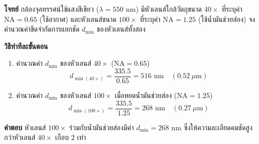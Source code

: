 \begin{worked}
\textbf{โจทย์} กล้องจุลทรรศน์ใช้แสงสีเขียว ($\lambda = 550\text{ nm}$) มีหัวเลนส์ใกล้วัตถุขนาด $40\times$ ที่ระบุค่า $\text{NA} = 0.65$ (ใช้อากาศ) และหัวเลนส์ขนาด $100\times$ ที่ระบุค่า $\text{NA} = 1.25$ (ใช้น้ำมันช่วยส่อง) จงคำนวณค่าขีดจำกัดการแยกชัด $d_{\min}$ ของหัวเลนส์ทั้งสอง

\textbf{วิธีทำทีละขั้นตอน}
\begin{enumerate}
    \item คำนวณค่า $d_{\min}$ ของหัวเลนส์ $40\times$ ($\text{NA} = 0.65$)
    \begin{equation*}
        d_{\min(40\times)} = \frac{335.5}{0.65} = 516\text{ nm} \quad (0.52\ \mu\text{m})
    \end{equation*}
    \item คำนวณค่า $d_{\min}$ ของหัวเลนส์ $100\times$ เมื่อหยดน้ำมันช่วยส่อง ($\text{NA} = 1.25$)
    \begin{equation*}
        d_{\min(100\times)} = \frac{335.5}{1.25} = 268\text{ nm} \quad (0.27\ \mu\text{m})
    \end{equation*}
\end{enumerate}
\textbf{คำตอบ} หัวเลนส์ $100\times$ ร่วมกับน้ำมันช่วยส่องมีค่า $d_{\min} = 268\text{ nm}$ ซึ่งให้ความละเอียดคมชัดสูงกว่าหัวเลนส์ $40\times$ เกือบ $2$ เท่า
\end{worked}


